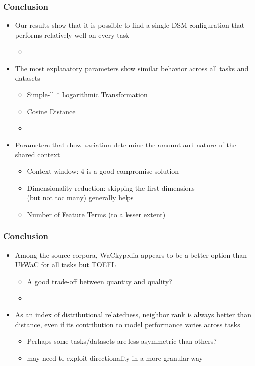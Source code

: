 \documentclass[t]{beamer} %
\begin{document}
\begin{frame}
  \frametitle{Conclusion}

  \begin{itemize}
  \item Our results show that it is possible to find a single DSM configuration that performs relatively well on every task
    \begin{itemize}
    \item[]
    \end{itemize}
  \item The most explanatory parameters show similar behavior across all tasks and datasets
    \begin{itemize}
    \item Simple-ll * Logarithmic Transformation 
    \item Cosine Distance
    \item[]
    \end{itemize}
  \item Parameters that show variation determine the amount and nature of the shared context
    \begin{itemize}
    \item Context window: 4 is a good compromise solution
    \item Dimensionality reduction: skipping the first dimensions\\ (but not too many) generally helps 
    \item Number of Feature Terms (to a lesser extent)
    \end{itemize}
  \end{itemize}
\end{frame}


\begin{frame}
  \frametitle{Conclusion}
  
  \begin{itemize}
  \item Among the source corpora, WaCkypedia appears to be a better option than UkWaC for all tasks but TOEFL
    \begin{itemize}
    \item A good trade-off between quantity and quality?
    \item[]
    \end{itemize}
  \item As an index of distributional relatedness, neighbor rank is always better than distance, even if its contribution to model performance varies across tasks
    \begin{itemize}
    \item Perhaps some tasks/datasets are less asymmetric than others? 
    \item may need to exploit directionality in a more granular way
    \end{itemize}
  \end{itemize}
\end{frame}



\end{document}

